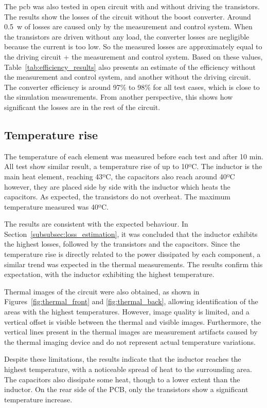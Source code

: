         The \ac{pcb} was also tested in open circuit with and without driving the transistors. The results show the losses of the circuit without the boost converter. Around 0.5~w of losses are caused only by the measurement and control system. When the transistors are driven without any load, the converter losses are negligible because the current is too low. So the measured losses are approximately equal to the driving circuit + the measurement and control system. Based on these values, Table~\ref{tab:efficiency_results} also presents an estimate of the efficiency without the measurement and control system, and another without the driving circuit. The converter efficiency is around 97\% to 98\% for all test cases, which is close to the simulation measurements. From another perspective, this shows how significant the losses are in the rest of the circuit.         

    \subsection{Temperature rise}
        The temperature of each element was measured before each test and after 10 min. All test show similar result, a temperature rise of up to 10ºC. The inductor is the main heat element, reaching 43ºC, the capacitors also reach around 40ºC however, they are placed side by side with the inductor which heats the capacitors. As expected, the transistors do not overheat. The maximum temperature measured was 40ºC. 

        The results are consistent with the expected behaviour. In Section~\ref{subsubsec:loss_estimation}, it was concluded that the inductor exhibits the highest losses, followed by the transistors and the capacitors. Since the temperature rise is directly related to the power dissipated by each component, a similar trend was expected in the thermal measurements. The results confirm this expectation, with the inductor exhibiting the highest temperature.

        Thermal images of the circuit were also obtained, as shown in Figures~\ref{fig:thermal_front} and \ref{fig:thermal_back}, allowing identification of the areas with the highest temperatures. However, image quality is limited, and a vertical offset is visible between the thermal and visible images. Furthermore, the vertical lines present in the thermal images are measurement artifacts caused by the thermal imaging device and do not represent actual temperature variations.

        Despite these limitations, the results indicate that the inductor reaches the highest temperature, with a noticeable spread of heat to the surrounding area. The capacitors also dissipate some heat, though to a lower extent than the inductor. On the rear side of the PCB, only the transistors show a significant temperature increase.


